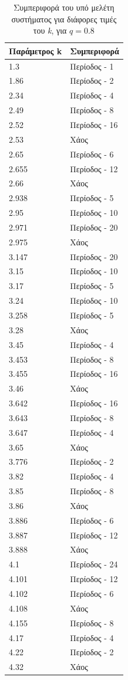 \begin{table}[ht]
	\centering
	\caption{ Συμπεριφορά του υπό μελέτη συστήματος για διάφορες τιμές του \emph{k}, για $q=0.8$ }
	\label{tab:abc12}
	\begin{tabular}{l | l}
		Παράμετρος k & Συμπεριφορά \\
		\hline
		1.3 &  Περίοδος -  1 \\
		1.86 &  Περίοδος -  2 \\
		2.34& Περίοδος -  4 \\
		2.49& Περίοδος -  8 \\
		2.52& Περίοδος -  16 \\
		2.53 & Xάος \\
		2.65& Περίοδος - 6 \\
		2.655& Περίοδος - 12\\
		2.66& Χάος \\
		2.938& Περίοδος - 5 \\
		2.95 &  Περίοδος - 10  \\
		2.971 &  Περίοδος -  20 \\
		2.975 &  Χάος \\
		3.147& Περίοδος - 20 \\
		3.15 &  Περίοδος - 10  \\
		3.17 &  Περίοδος -  5 \\
		3.24 &Περίοδος - 10 \\
		3.258 &  Περίοδος -  5\\
		3.28 &Χάος \\
		3.45 & Περίοδος - 4\\
		3.453& Περίοδος - 8\\
		3.455& Περίοδος - 16\\
		3.46& Xάος\\
		3.642& Περίοδος - 16\\
		3.643 & Περίοδος - 8\\
		3.647& Περίοδος - 4\\
		3.65 & Χάος\\
		3.776 & Περίοδος -  2\\
		3.82 & Περίοδος -  4\\
		3.85 & Περίοδος -  8\\
		3.86 & Xάος\\
		3.886 & Περίοδος -  6\\
		3.887 & Περίοδος -  12\\
		3.888 & Χάος\\
		4.1& Περίοδος -  24\\
		4.101& Περίοδος -  12\\
		4.102 & Περίοδος -  6\\
		4.108 & Χάος\\
		4.155 & Περίοδος -  8\\
		4.17 & Περίοδος -  4\\
		4.22 & Περίοδος -  2\\
		4.32 &  Χάος\\
			
	\end{tabular}
	
\end{table}

